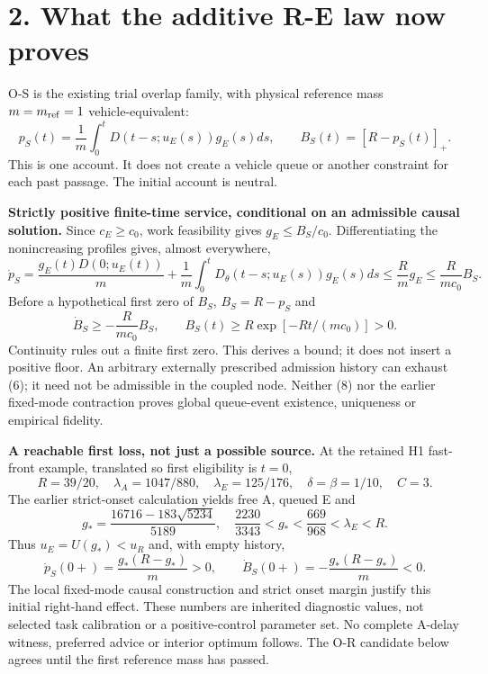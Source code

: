 \documentclass[11pt,a4paper]{article}
\newcommand{\pos}[1]{[#1]_+}
\begin{document}
\newpage
\section*{2. What the additive R-E law now proves}

O-S is the existing trial overlap family, with physical reference mass
$m=m_{\rm ref}=1$ vehicle-equivalent:
\begin{equation}
 p_S(t)=\frac1m\int_0^tD(t-s;u_E(s))g_E(s)ds,\qquad
 B_S(t)=\pos{R-p_S(t)}. \tag{6}
\end{equation}
This is one account. It does not create a vehicle queue or another
constraint for each past passage. The initial account is neutral.

\textbf{Strictly positive finite-time service, conditional on an admissible
causal solution.} Since $c_E\geq c_0$, work feasibility gives
$g_E\leq B_S/c_0$. Differentiating the nonincreasing profiles gives,
almost everywhere,
\begin{equation}
 \dot p_S=\frac{g_E(t)D(0;u_E(t))}m+
  \frac1m\int_0^tD_\theta(t-s;u_E(s))g_E(s)ds
 \leq\frac Rm g_E\leq\frac{R}{mc_0}B_S. \tag{7}
\end{equation}
Before a hypothetical first zero of $B_S$, $B_S=R-p_S$ and
\begin{equation}
 \dot B_S\geq-\frac{R}{mc_0}B_S,\qquad
 B_S(t)\geq R\exp[-Rt/(mc_0)]>0. \tag{8}
\end{equation}
Continuity rules out a finite first zero. This derives a bound; it does not
insert a positive floor. An arbitrary externally prescribed admission
history can exhaust (6); it need not be admissible in the coupled node.
Neither (8) nor the earlier fixed-mode contraction proves global queue-event
existence, uniqueness or empirical fidelity.

\textbf{A reachable first loss, not just a possible source.} At the retained
H1 fast-front example, translated so first eligibility is $t=0$,
\begin{equation}
 R=39/20,\quad \lambda_A=1047/880,\quad \lambda_E=125/176,
 \quad \delta=\beta=1/10,\quad C=3. \tag{9}
\end{equation}
The earlier strict-onset calculation yields free A, queued E and
\begin{equation}
 g_* =\frac{16716-183\sqrt{5234}}{5189},\quad
 \frac{2230}{3343}<g_*<\frac{669}{968}<\lambda_E<R. \tag{10}
\end{equation}
Thus $u_E=U(g_*)<u_R$ and, with empty history,
\begin{equation}
 \dot p_S(0+)=\frac{g_*(R-g_*)}m>0,\qquad
 \dot B_S(0+)=-\frac{g_*(R-g_*)}m<0. \tag{11}
\end{equation}
The local fixed-mode causal construction and strict onset margin justify
this initial right-hand effect. These numbers are inherited diagnostic
values, not selected task calibration or a positive-control parameter set.
No complete A-delay witness, preferred advice or interior optimum follows.
The O-R candidate below agrees until the first reference mass has passed.
\end{document}
